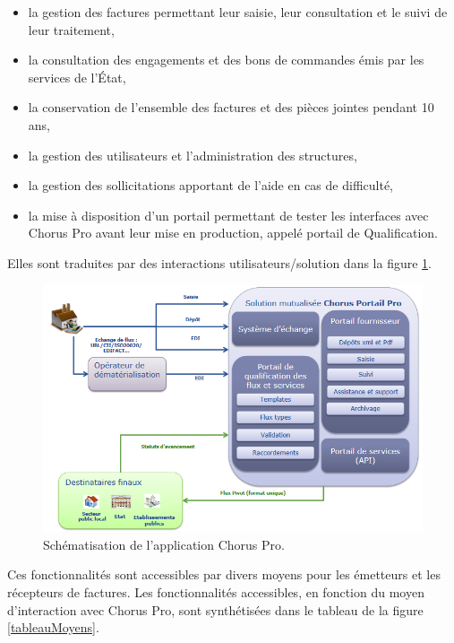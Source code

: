 \documentclass[12pt,a4paper]{article}
\begin{document}
\smallbreak
\begin{itemize}
\item la gestion des factures permettant leur saisie, leur consultation et le suivi de leur traitement,
\item la consultation des engagements et des bons de commandes émis par les
services de l’État,
\item la conservation de l’ensemble des factures et des pièces jointes pendant 10 ans,
\item la gestion des utilisateurs et l'administration des structures,
\item la gestion des sollicitations apportant de l'aide en cas de difficulté,
\item la mise à disposition d'un portail permettant de tester les interfaces avec Chorus Pro avant leur mise en production, appelé portail de Qualification.
\end{itemize}
\medbreak
Elles sont traduites par des interactions utilisateurs/solution dans la figure \ref{schematisation}.
\bigbreak
\begin{figure}[H]
	\begin{center}
		\includegraphics[width=\textwidth,height=\textheight,keepaspectratio]{solutionSimplifiee.png}
		\caption{Schématisation de l'application Chorus Pro.}
		\label{schematisation}
	\end{center}
\end{figure}
\clearpage
\newpage
Ces fonctionnalités sont accessibles par divers moyens pour les émetteurs et les récepteurs de factures. Les fonctionnalités accessibles, en fonction du moyen d'interaction avec Chorus Pro, sont synthétisées dans le tableau de la figure \ref{tableauMoyens}.
\end{document}
